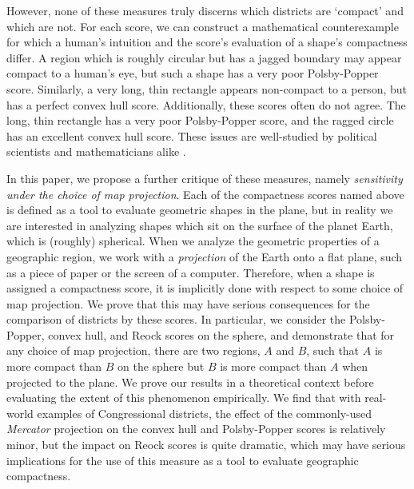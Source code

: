 However, none of these measures truly discerns which districts are \enquote*{compact} and which are not. 
For each score, we can construct a 
mathematical counterexample for which
a human's intuition and the score's evaluation of a shape's
compactness differ.  A region which is roughly circular but has a jagged boundary 
may appear compact to a human's eye, but such a shape has a very poor Polsby-Popper score.  Similarly, a very long, thin rectangle appears non-compact to a person, but has a perfect convex hull score.  Additionally, these scores often do not agree.
The long, thin rectangle has a  very
poor Polsby-Popper score, and the ragged circle has an excellent convex hull score.  These issues are well-studied by political
scientists and mathematicians alike
\cite{polsby1991third,frolov1975shape,maceachren1985compact,barnes2018gerrymandering}.




In this paper, we propose a further critique of these measures, namely
\textit{sensitivity under the choice of map projection}.  Each of the
compactness scores named above is defined as a tool to evaluate
geometric shapes in the plane, but in reality we are interested in
analyzing shapes which sit on the surface of the planet Earth, which
is (roughly) spherical.  
When we analyze the geometric properties of a geographic region, we work 
with a \textit{projection} of the Earth onto a flat plane, such as a piece of 
paper or the screen of a computer.
Therefore, when a shape is assigned a compactness score,
it is implicitly done with respect to some choice of map projection.
We prove that this may have
serious consequences for the comparison of districts by these scores.  In
particular, we consider the Polsby-Popper, convex hull,
and Reock scores on the sphere, and demonstrate that for any choice of
map projection, there are two regions, $A$ and $B$, such that $A$ is
more compact than $B$ on the sphere but $B$ is more compact than $A$
when projected to the plane.  We prove our results in a theoretical context 
before evaluating the extent of this phenomenon empirically.  We find 
that with real-world examples of Congressional districts, the effect 
of the commonly-used \textit{Mercator} projection on the convex 
hull and Polsby-Popper scores is relatively minor, but the impact on 
Reock scores is quite dramatic, which may have serious implications 
for the use of this measure as a tool to evaluate geographic compactness.

